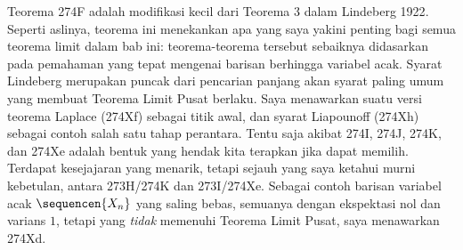 {Teorema 274F adalah modifikasi kecil dari Teorema 3 dalam
{\smc Lindeberg 1922}. Seperti aslinya, teorema ini menekankan apa yang saya
yakini penting bagi semua teorema limit dalam bab ini: teorema-teorema tersebut
sebaiknya didasarkan pada pemahaman yang tepat mengenai barisan berhingga
variabel acak. Syarat Lindeberg merupakan puncak dari pencarian panjang akan
syarat paling umum yang membuat Teorema Limit Pusat berlaku. Saya menawarkan
suatu versi teorema Laplace (274Xf) sebagai titik awal, dan syarat Liapounoff
(274Xh) sebagai contoh salah satu tahap perantara. Tentu saja akibat 274I,
274J, 274K, dan 274Xe adalah bentuk yang hendak kita terapkan jika dapat
memilih. Terdapat kesejajaran yang menarik, tetapi sejauh yang saya ketahui
murni kebetulan, antara 273H/274K dan 273I/274Xe. Sebagai contoh barisan
variabel acak $\sequencen{X_n}$ yang saling bebas, semuanya dengan ekspektasi
nol dan varians $1$, tetapi yang {\it tidak} memenuhi Teorema Limit Pusat, saya
menawarkan 274Xd.
}%

\discrpage
